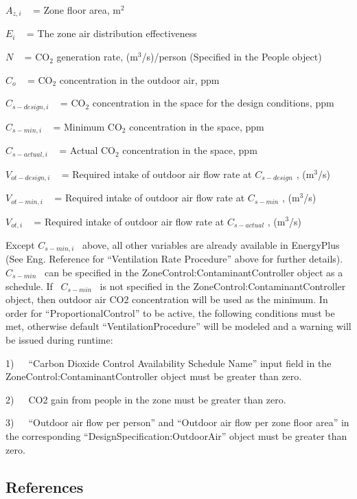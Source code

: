 \({A_{z,i}}\) ~ = Zone floor area, m\(^{2}\)

\({E_i}\) ~ = The zone air distribution effectiveness

\(N\) ~ = CO\(_{2}\) generation rate, (m\(^{3}\)/s)/person (Specified in the People object)

\({C_o}\) ~ = CO\(_{2}\) concentration in the outdoor air, ppm

\({C_{s - design,i}}\) ~ = CO\(_{2}\) concentration in the space for the design conditions, ppm

\({C_{s - min,i}}\) ~ = Minimum CO\(_{2}\) concentration in the space, ppm

\({C_{s - actual,i}}\) ~ = Actual CO\(_{2}\) concentration in the space, ppm

\({V_{ot - design,i}}\) ~ = Required intake of outdoor air flow rate at \({C_{s - design}}\) , (m\(^{3}\)/s)

\({V_{ot - min,i}}\) ~ = Required intake of outdoor air flow rate at \({C_{s - min}}\) , (m\(^{3}\)/s)

\({V_{ot,i}}\) ~ = Required intake of outdoor air flow rate at \({C_{s - actual}}\) , (m\(^{3}\)/s)

Except \({C_{s - min,i}}\) ~above, all other variables are already available in EnergyPlus (See Eng. Reference for ``Ventilation Rate Procedure'' above for further details). \({C_{s - min}}\) ~can be specified in the ZoneControl:ContaminantController object as a schedule. If~ \({C_{s - min}}\) ~is not specified in the ZoneControl:ContaminantController object, then outdoor air CO2 concentration will be used as the minimum. In order for ``ProportionalControl'' to be active, the following conditions must be met, otherwise default ``VentilationProcedure'' will be modeled and a warning will be issued during runtime:

1)~~~``Carbon Dioxide Control Availability Schedule Name'' input field in the ZoneControl:ContaminantController object must be greater than zero.

2)~~~CO2 gain from people in the zone must be greater than zero.

3)~~~``Outdoor air flow per person'' and ``Outdoor air flow per zone floor area'' in the corresponding ``DesignSpecification:OutdoorAir'' object must be greater than zero.

\subsection{References}\label{references-018}


